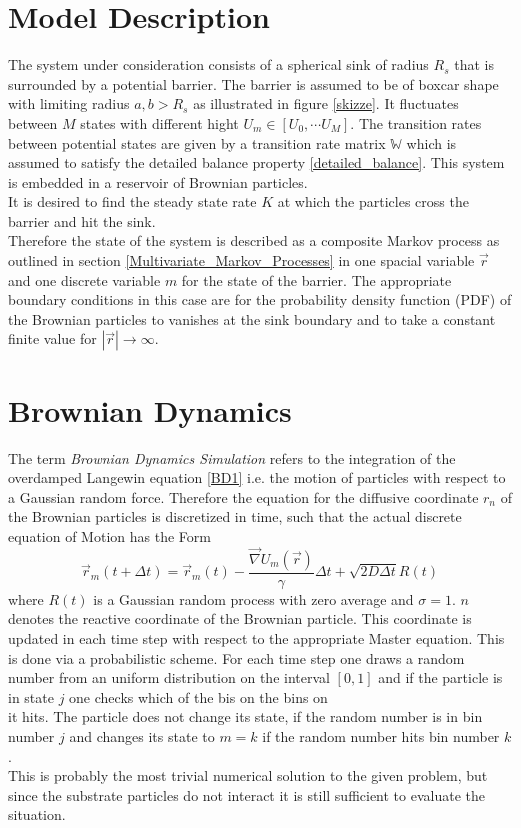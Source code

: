 \section{Model Description}
\label{Model_Description}
The system under consideration consists of a spherical sink of radius $R_s$ that is surrounded by a potential barrier. The barrier is assumed to be of boxcar shape with limiting radius $a,b>R_s$ as illustrated in figure \ref{skizze}. It fluctuates between $M$ states with different hight $U_m \in [U_0, \cdots U_M]$. The transition rates between potential states are given by a transition rate matrix $\mathbb{W}$ which is assumed to satisfy the detailed balance property \eqref{detailed_balance}. This system is embedded in a reservoir of Brownian particles. \\
It is desired to find the steady state rate $K$ at which the particles cross the barrier and hit the sink.\\
Therefore the state of the system is described as a composite Markov process as outlined in section \ref{Multivariate_Markov_Processes} in one spacial variable $\vec{r}$ and one discrete variable $m$ for the state of the barrier.
The appropriate boundary conditions in this case are for the probability density function (PDF) of the Brownian particles to vanishes at the sink boundary and to take a constant finite value for $|\vec{r}| \rightarrow \infty$. \\
\section{Brownian Dynamics}
\label{BDsim}
The term \textit{Brownian Dynamics Simulation} refers to the integration of the overdamped Langewin equation \eqref{BD1} i.e. the motion of particles with respect to a Gaussian random force. Therefore the equation for the diffusive coordinate $r_n$ of the Brownian particles is discretized in time, such that the actual discrete equation of Motion has the Form
\begin{equation}
    \vec r_m(t + \Delta t) = \vec r_m(t) - \frac{\vec \nabla U_m(\vec r)}{\gamma}\Delta t + \sqrt{2 D \Delta t} R(t)
    \label{discrete_eqm}
\end{equation}
where $R(t)$ is a Gaussian random process with zero average and $\sigma = 1$. $n$ denotes the reactive coordinate of the Brownian particle. This coordinate is updated in each time step with respect to the appropriate Master equation. This is done via a probabilistic scheme. For each time step one draws a random number from an uniform distribution on the interval $[0,1]$ and if the particle is in state $j$ one checks which of the bis on the bins on 
\begin{equation}
    [W_{1,j}, \cdots , W_{j-1,j},1 - \sum_{i \ne j} W_{i,j}, W_{j+1,j}, \cdots , W_{M,j}]
    \label{num_meq}
\end{equation}
it hits. The particle does not change its state, if the random number is in bin number $j$ and changes its state to $m = k$ if the random number hits bin number $k$.\\
This is probably the most trivial numerical solution to the given problem, but since the substrate particles do not interact it is still sufficient to evaluate the situation.

